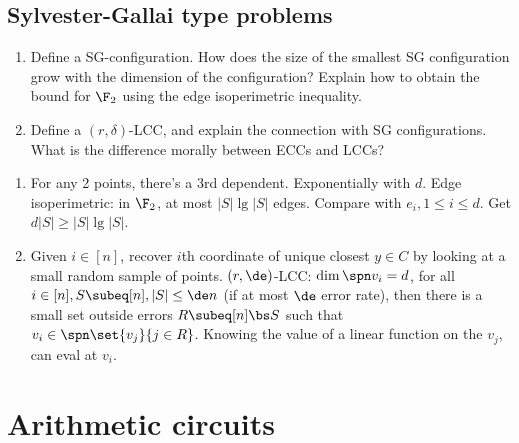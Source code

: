 \subsection{Sylvester-Gallai type problems}
\begin{enumerate}
\item
Define a SG-configuration. How does the size of the smallest SG configuration grow with the dimension of the configuration? Explain how to obtain the bound for $\F_2$ using the edge isoperimetric inequality.
\item
Define a $(r,\delta)$-LCC, and explain the connection with SG configurations. What is the difference morally between ECCs and LCCs?
\end{enumerate}
\begin{enumerate}
\item
For any 2 points, there's a 3rd dependent.
Exponentially with $d$.
Edge isoperimetric: in $\F_2$, at most $|S|\lg|S|$ edges. 
Compare with $e_i, 1\le i\le d$. Get $d|S|\ge |S|\lg |S|$.
\item
Given $i\in [n]$, recover $i$th coordinate of unique closest $y\in C$ by looking at a small random sample of points. 
$(r,\de)$-LCC: $\dim\spn v_i = d$, for all $i\in [n], S\subeq [n], |S|\le \de n$ (if at most $\de$ error rate), then there is a small set outside errors $R\subeq [n]\bs S$ such that $v_i\in \spn\set{v_j}{j\in R}$.
Knowing the value of a linear function on the $v_j$, can eval at $v_i$. 
\end{enumerate}

\section{Arithmetic circuits}

